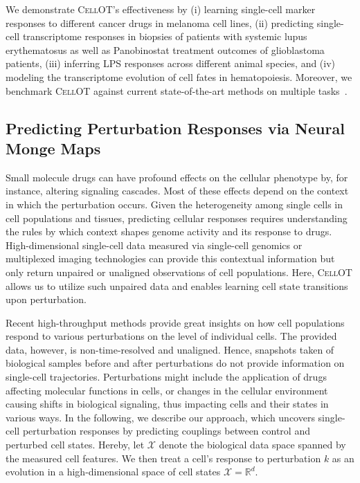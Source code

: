  We demonstrate \textsc{CellOT}'s effectiveness by (i) learning single-cell marker responses to different cancer drugs in melanoma cell lines, (ii) predicting single-cell transcriptome responses in biopsies of patients with systemic lupus erythematosus as well as Panobinostat treatment outcomes of glioblastoma patients, (iii) inferring LPS responses across different animal species, and (iv) modeling the transcriptome evolution of cell fates in hematopoiesis. Moreover, we benchmark \textsc{CellOT} against current state-of-the-art methods on multiple tasks~\citep{lopez2018scvi, lotfollahi2019scgen}.


\subsection{Predicting Perturbation Responses via Neural Monge Maps}

Small molecule drugs can have profound effects on the cellular phenotype by, for instance, altering signaling cascades. Most of these effects depend on the context in which the perturbation occurs. Given the heterogeneity among single cells in cell populations and tissues, predicting cellular responses requires understanding the rules by which context shapes genome activity and its response to drugs. High-dimensional single-cell data measured via single-cell genomics or multiplexed imaging technologies can provide this contextual information but only return  unpaired or unaligned observations of cell populations. Here, \textsc{CellOT} allows us to utilize such unpaired data and enables learning cell state transitions upon perturbation.


Recent high-throughput methods provide great insights on how cell populations respond to various perturbations on the level of individual cells. The provided data, however, is non-time-resolved and unaligned. 
Hence, snapshots taken of biological samples before and after perturbations do not provide information on single-cell trajectories.
Perturbations might include the application of drugs affecting molecular functions in cells, or changes in the cellular environment causing shifts in biological signaling, thus impacting cells and their states in various ways.
In the following, we describe our approach, which uncovers single-cell perturbation responses by predicting couplings between control and perturbed cell states.
Hereby, let $\mathcal{X}$ denote the biological data space spanned by the measured cell features. We then treat a cell's response to perturbation $k$ as an evolution in a high-dimensional space of cell states $\mathcal{X} = \mathbb{R}^d$.


